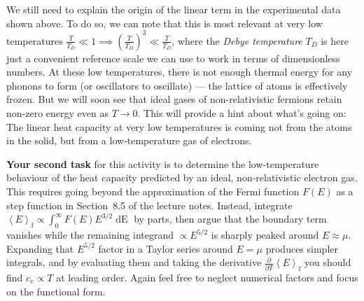 \documentclass[12 pt]{article} %
\newcommand{\vev}[1]{\ensuremath{\left\langle #1 \right\rangle} }
\newcommand{\pderiv}[2]{\ensuremath{\frac{\partial #1}{\partial #2}} }
\begin{document}
We still need to explain the origin of the linear term in the experimental data shown above.
To do so, we can note that this is most relevant at very low temperatures $\frac{T}{T_D} \ll 1 \implies \left(\frac{T}{T_D}\right)^3 \ll \frac{T}{T_D}$, where the \textit{Debye temperature} $T_D$ is here just a convenient reference scale we can use to work in terms of dimensionless numbers.
At these low temperatures, there is not enough thermal energy for any phonons to form (or oscillators to oscillate) --- the lattice of atoms is effectively frozen.
But we will soon see that ideal gases of non-relativistic fermions retain non-zero energy even as $T \to 0$.
This will provide a hint about what's going on: The linear heat capacity at very low temperatures is coming not from the atoms in the solid, but from a low-temperature gas of electrons.

\textbf{Your second task} for this activity is to determine the low-temperature behaviour of the heat capacity predicted by an ideal, non-relativistic electron gas.
This requires going beyond the approximation of the Fermi function $F(E)$ as a step function in Section~8.5 of the lecture notes.
Instead, integrate $\vev{E}_{\text{f}} \propto \int_0^{\infty} F(E) E^{3 / 2} \mathop{dE}$ by parts, then argue that the boundary term vanishes while the remaining integrand $\propto E^{5 / 2}$ is sharply peaked around $E \approx \mu$.
Expanding that $E^{5 / 2}$ factor in a Taylor series around $E = \mu$ produces simpler integrals, and by evaluating them and taking the derivative $\pderiv{}{T}\vev{E}_{\text{f}}$ you should find $c_v \propto T$ at leading order.
Again feel free to neglect numerical factors and focus on the functional form.
\end{document}
